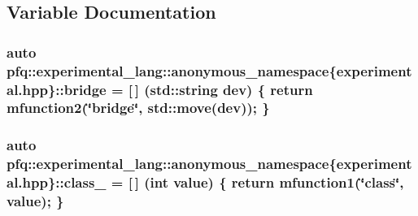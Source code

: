\subsection{Variable Documentation}
\hypertarget{namespacepfq_1_1experimental__lang_1_1anonymous__namespace_02experimental_8hpp_03_a526de05a8841ca47c01174ed2fbc7a81}{
\subsubsection[{bridge}]{\setlength{\rightskip}{0pt plus 5cm}auto pfq\+::experimental\+\_\+lang\+::anonymous\+\_\+namespace\{experimental.\+hpp\}\+::bridge = \mbox{[}$\,$\mbox{]} (std\+::string dev) \{ return mfunction2(\char`\"{}bridge\char`\"{}, std\+::move(dev)); \}}}\label{namespacepfq_1_1experimental__lang_1_1anonymous__namespace_02experimental_8hpp_03_a526de05a8841ca47c01174ed2fbc7a81}
\hypertarget{namespacepfq_1_1experimental__lang_1_1anonymous__namespace_02experimental_8hpp_03_aab201738a448e9f995300724e6c1de44}{
\subsubsection[{class\+\_\+}]{\setlength{\rightskip}{0pt plus 5cm}auto pfq\+::experimental\+\_\+lang\+::anonymous\+\_\+namespace\{experimental.\+hpp\}\+::class\+\_\+ = \mbox{[}$\,$\mbox{]} (int value) \{ return mfunction1(\char`\"{}class\char`\"{}, value); \}}}\label{namespacepfq_1_1experimental__lang_1_1anonymous__namespace_02experimental_8hpp_03_aab201738a448e9f995300724e6c1de44}
